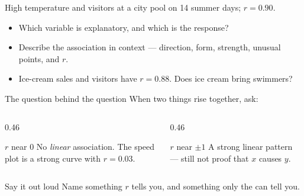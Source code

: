 \documentclass[aspectratio=169, 11pt]{beamer}
\begin{document}
\begin{frame}[t, plain]
  High temperature and visitors at a city pool on 14 summer days; $r = 0.90$.
  \begin{itemize}\setlength{\itemsep}{6pt}
    \item Which variable is explanatory, and which is the response?
    \item Describe the association in context --- direction, form, strength, unusual points,
          and $r$.
    \item Ice-cream sales and visitors have $r = 0.88$. Does ice cream bring swimmers?
  \end{itemize}
  \begin{block}{The question behind the question}
    When two things rise together, ask: 
  \end{block}
\end{frame}

\begin{frame}[t, plain]
  \vspace{6pt}
  \begin{columns}[T]
    \begin{column}{0.46\textwidth}
      \begin{block}{$r$ near 0}
        No \emph{linear} association. The speed plot is a strong curve with $r = 0.03$.
      \end{block}
    \end{column}
    \begin{column}{0.46\textwidth}
      \begin{block}{$r$ near $\pm 1$}
        A strong linear pattern --- still not proof that $x$ causes $y$.
      \end{block}
    \end{column}
  \end{columns}
  \vspace{14pt}
  \begin{block}{Say it out loud}
    Name something $r$ tells you, and something only the  can tell you.
  \end{block}
\end{frame}
\end{document}
